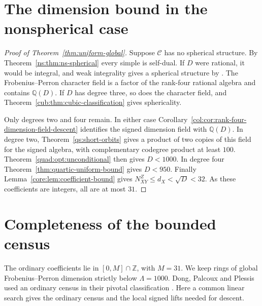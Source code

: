 \documentclass[11pt,a4paper]{article}
\theoremstyle{definition}\newtheorem{definition}[theorem]{Definition}
\theoremstyle{remark}\newtheorem{remark}[theorem]{Remark}
\newcommand{\C}{\mathcal C}
\newcommand{\Q}{\mathbb Q}
\newcommand{\ZZ}{\mathbb Z}
\numberwithin{equation}{section}
\begin{document}
\section{The dimension bound in the nonspherical case}\label{sec:global-bound-proof}
\begin{proof}[Proof of Theorem~\ref{thm:uniform-global}]
Suppose $\C$ has no spherical structure. By
Theorem~\ref{ns:thm:ns-spherical} every simple is self-dual.
If $D$ were rational, it would be integral, and weak integrality gives
a spherical structure by \cite[Proposition~8.24]{ENO}.
The Frobenius--Perron character field is a factor of the rank-four
rational algebra and contains $\Q(D)$. If $D$ has degree three,
so does the character field, and
Theorem~\ref{cub:thm:cubic-classification} gives sphericality.

Only degrees two and four remain. In either case
Corollary~\ref{col:cor:rank-four-dimension-field-descent} identifies
the signed dimension field with $\Q(D)$. In degree two,
Theorem~\ref{qs:short-orbits} gives a product of two copies of this
field for the signed algebra, with complementary codegree product at
least $100$. Theorem~\ref{quad:opt:unconditional} then gives $D<1000$.
In degree four Theorem~\ref{thm:quartic-uniform-bound} gives $D<950$.
Finally Lemma~\ref{core:lem:coefficient-bound} gives
$N_{XY}^{Z}\le d_X<\sqrt D<32$. As these coefficients are integers,
all are at most $31$.
\end{proof}
\section{Completeness of the bounded census}\label{app:ordinary-census}
The ordinary coefficients lie in $[0,M]\cap\ZZ$, with $M=31$.
We keep rings of global Frobenius--Perron dimension strictly below
$\Lambda=1000$. Dong, Palcoux and Plessis used an ordinary census in their pivotal
classification \cite{DPP}. Here a common linear search gives the ordinary
census and the local signed lifts needed for descent.
\end{document}
